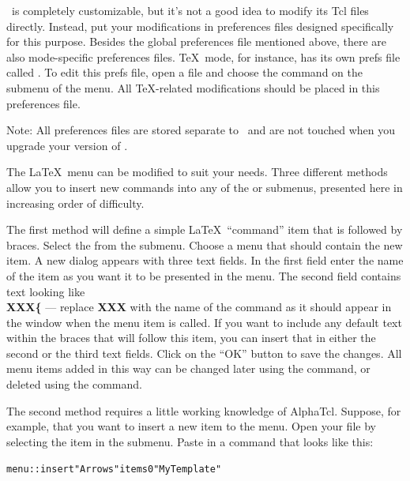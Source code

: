 \documentclass{report}
\begin{document}
\Alpha\ is completely customizable, but it's not a good idea to 
modify its Tcl files directly.  Instead, put your modifications in 
preferences files designed specifically for this purpose.  Besides 
the global preferences file  mentioned above, 
there are also mode-specific preferences files.  \TeX\ mode, for 
instance, has its own prefs file called .  To 
edit this prefs file, open a  file and choose the 
command  on the  submenu of the 
 menu.  All \TeX-related modifications should be 
placed in this preferences file.

Note: All preferences files are stored separate to \Alpha\ and are not
touched when you upgrade your version of \Alpha.

The \LaTeX\ menu can be modified to suit your needs.  Three different
methods allow you to insert new commands into any of the 
or  submenus, presented here in increasing order of 
difficulty.

The first method will define a simple \LaTeX\ ``command'' item that is
followed by braces.  Select the  from the
 submenu.  Choose a menu that should contain the new
item.  A new dialog appears with three text fields.  In the first field
enter the name of the item as you want it to be presented in the menu.
The second field contains text looking like 
\textbf{\\XXX\textbullet\{\textbullet} --- replace \textbf{XXX} with 
the name of the command as it should appear in the window when the 
menu item is called.  If you want to include any default text within 
the braces that will follow this item, you can insert that in either 
the second or the third text fields.  Click on the ``OK'' button to 
save the changes.  All menu items added in this way can be changed 
later using the  command, or deleted using the 
 command.

The second method requires a little working knowledge of AlphaTcl.
Suppose, for example, that you want to insert a new 
item to the  menu.  Open your 
file by selecting the  item in the  submenu.  Paste in a command that looks
like this:

\begin{alltt}
	menu::insert "Arrows" items 0 "My Template"
\end{alltt}
\end{document}
